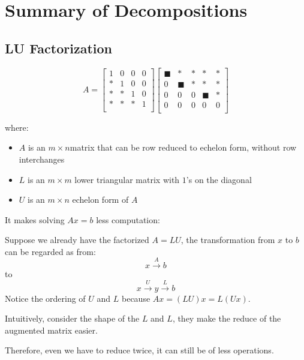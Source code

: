 \chapter{Summary of Decompositions}

\section{LU Factorization} \label{sec: LU Factorization}

\begin{definition}
    \[
        A = 
        \begin{bmatrix}
            1 & 0 & 0 &  0 \\
            * & 1 & 0 &  0 \\
            * & * & 1 &  0 \\
            * & * & * &  1 \\
        \end{bmatrix}
        \begin{bmatrix}
            \blacksquare & * & * & * & *  \\
            0 & \blacksquare  & * & * & *  \\
            0 & 0 & 0 & \blacksquare & *  \\
            0 & 0 & 0 & 0 & 0 \\
        \end{bmatrix}
    \]

    where:
    \begin{itemize}
        \item \(A\) is an \(m \times n\)matrix that can be row reduced to echelon form, without row interchanges 
        \item \(L\) is an \(m \times m\) lower triangular matrix with \(1\)'s on the diagonal
        \item \(U\) is an \(m \times n\) echelon form of \(A\)     
    \end{itemize}
\end{definition}

\begin{remark}
   It makes solving \(Ax = b\) less computation:
   
   Suppose we already have the factorized \(A = LU\), the transformation from \(x\) to \(b\) can be regarded as from:    
   \[
    x \xrightarrow{A} b
   \]
   to 
   \[
   x \xrightarrow{U}  y \xrightarrow{L} b
   \]
    Notice the ordering of \(U\) and \(L\) because \(Ax = (LU)x = L(Ux)\).   

    Intuitively, consider the shape of the \(L\) and \(L\), they make the reduce of the augmented matrix easier.  

    Therefore, even we have to reduce twice, it can still be of less operations.
\end{remark}

